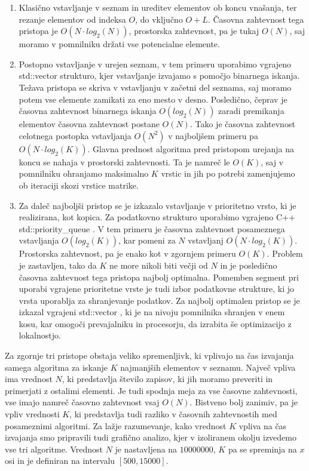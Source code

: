 \documentclass[a4paper,12pt,openright]{book}
\begin{document}
        \begin{enumerate}
            \item Klasično vstavljanje v seznam in ureditev elementov ob koncu vnašanja, ter rezanje elementov od indeksa $O$, do vključno $O+L$. Časovna zahtevnost tega pristopa je $O(N \cdot log_2(N))$, prostorska zahtevnost, pa je tukaj $O(N)$, saj moramo v pomnilniku držati vse potencialne elemente.
            \item Postopno vstavljanje v urejen seznam, v tem primeru uporabimo vgrajeno std::vector \cite{CPP_VECTOR} strukturo, kjer vstavljanje izvajamo s pomočjo binarnega iskanja. Težava pristopa se skriva v vstavljanju v začetni del seznama, saj moramo potem vse elemente zamikati za eno mesto v desno. Posledično, čeprav je časovna zahtevnost binarnega iskanja $O(log_2(N))$ zaradi premikanja elementov časovna zahtevnost postane $O(N)$. Tako je časovna zahtevnost celotnega postopka vstavljanja $O(N^2)$ v najboljšem primeru pa $O(N \cdot log_2(K))$. Glavna prednost algoritma pred pristopom urejanja na koncu se nahaja v prostorski zahtevnosti. Ta je namreč le $O(K)$, saj v pomnilniku ohranjamo maksimalno $K$ vrstic in jih po potrebi zamenjujemo ob iteraciji skozi vrstice matrike.
            \item Za daleč najboljši pristop se je izkazalo vstavljanje v prioritetno vrsto, ki je realizirana, kot kopica. Za podatkovno strukturo uporabimo vgrajeno C++ std::priority\_queue \cite{CPP_PQUEUE}. V tem primeru je časovna zahtevnost posameznega vstavljanja $O(log_2(K))$, kar pomeni za $N$ vstavljanj $O(N \cdot log_2(K))$. Prostorska zahtevnost, pa je enako kot v zgornjem primeru $O(K)$. Problem je zastavljen, tako da $K$ ne more nikoli biti večji od $N$ in je posledično časovna zahtevnost tega pristopa najbolj optimalna. Pomemben segment pri uporabi vgrajene prioritetne vrste je tudi izbor podatkovne strukture, ki jo vrsta uporablja za shranjevanje podatkov. Za najbolj optimalen pristop se je izkazal vgrajeni std::vector \cite{CPP_VECTOR}, ki je na nivoju pomnilnika shranjen v enem kosu, kar omogoči prevajalniku in procesorju, da izrabita še optimizacijo z lokalnostjo.
        \end{enumerate}

        \noindent
        Za zgornje tri pristope obstaja veliko spremenljivk, ki vplivajo na čas izvajanja samega algoritma za iskanje $K$ najmanjših elementov v seznamu. Največ vpliva ima vrednost $N$, ki predstavlja število zapisov, ki jih moramo preveriti in primerjati z ostalimi elementi. Je tudi spodnja meja za vse časovne zahtevnosti, vse imajo namreč časovno zahtevnost vsaj $O(N)$. Bistveno bolj zanimiv, pa je vpliv vrednosti $K$, ki predstavlja tudi razliko v časovnih zahtevnostih med posameznimi algoritmi. Za lažje razumevanje, kako vrednost $K$ vpliva na čas izvajanja smo pripravili tudi grafično analizo, kjer v izoliranem okolju izvedemo vse tri algoritme. Vrednost $N$ je nastavljena na $\num{10000000}$, $K$ pa se spreminja na $x$ osi in je definiran na intervalu $[500, 15000]$.
\end{document}

